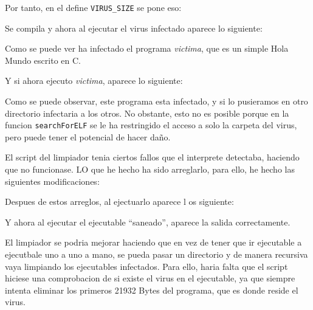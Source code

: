 \documentclass{article}
\begin{document}
Por tanto, en el define \verb|VIRUS_SIZE| se pone eso:


Se compila y ahora al ejecutar el virus infectado aparece lo siguiente:


Como se puede ver ha infectado el programa \textit{victima}, que es un simple Hola Mundo escrito en C.

Y si ahora ejecuto \textit{victima}, aparece lo siguiente:


Como se puede observar, este programa esta infectado, y si lo pusieramos en otro directorio infectaria a los otros. No obstante, esto no es posible porque en la funcion \verb|searchForELF| se le ha restringido el acceso a solo la carpeta del virus, pero puede tener el potencial de hacer daño.



El script del limpiador tenia ciertos fallos que el interprete detectaba, haciendo que no funcionase. LO que he hecho ha sido arreglarlo, para ello, he hecho las siguientes modificaciones: 


Despues de estos arreglos, al ejectuarlo aparece l os siguiente:


Y ahora al ejecutar el ejecutable ``saneado'', aparece la salida correctamente.

El limpiador se podria mejorar haciendo que en vez de tener que ir ejecutable a ejecutbale uno a uno a mano, se pueda pasar un directorio y de manera recursiva vaya limpiando los ejecutables infectados. Para ello, haria falta que el script hiciese una comprobacion de si existe el virus en el ejecutable, ya que siempre intenta eliminar los primeros 21932 Bytes del programa, que es donde reside el virus.
\end{document}
